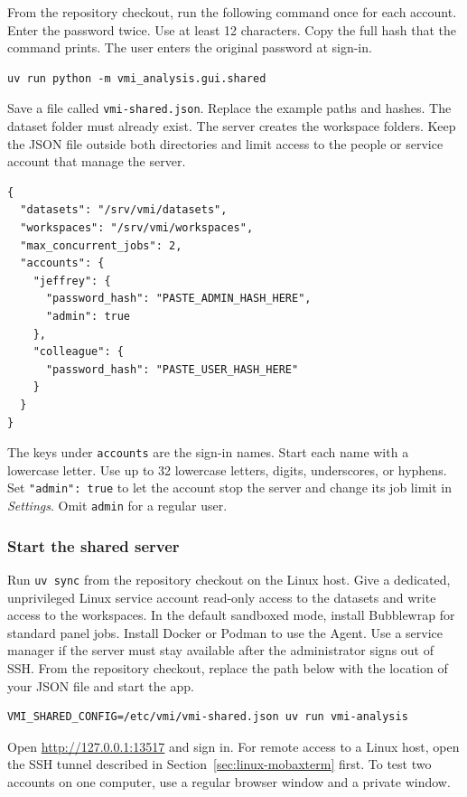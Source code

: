 \documentclass[11pt,a4paper]{article}
\newcommand{\code}[1]{\texttt{#1}}
\begin{document}
From the repository checkout, run the following command once for each
account. Enter the password twice. Use at least 12 characters. Copy the
full hash that the command prints. The user enters the original password
at sign-in.
\begin{verbatim}
uv run python -m vmi_analysis.gui.shared
\end{verbatim}

Save a file called \code{vmi-shared.json}. Replace the example paths and
hashes. The dataset folder must already exist. The server creates the
workspace folders. Keep the JSON file outside both directories and limit
access to the people or service account that manage the server.
\begin{verbatim}
{
  "datasets": "/srv/vmi/datasets",
  "workspaces": "/srv/vmi/workspaces",
  "max_concurrent_jobs": 2,
  "accounts": {
    "jeffrey": {
      "password_hash": "PASTE_ADMIN_HASH_HERE",
      "admin": true
    },
    "colleague": {
      "password_hash": "PASTE_USER_HASH_HERE"
    }
  }
}
\end{verbatim}

The keys under \code{accounts} are the sign-in names. Start each name with
a lowercase letter. Use up to 32 lowercase letters, digits, underscores,
or hyphens. Set \code{"admin": true} to let the account stop the server and
change its job limit in \emph{Settings}. Omit \code{admin} for a regular user.

\subsubsection{Start the shared server}

Run \code{uv sync} from the repository checkout on the Linux host.
Give a dedicated, unprivileged Linux service account read-only access to
the datasets and write access to the workspaces. In the default sandboxed
mode, install Bubblewrap for standard panel jobs. Install Docker or Podman
to use the Agent.
Use a service manager if the server must stay available after the administrator signs out of SSH.
From the repository checkout, replace the path below with the location of
your JSON file and start the app.
\begin{verbatim}
VMI_SHARED_CONFIG=/etc/vmi/vmi-shared.json uv run vmi-analysis
\end{verbatim}

Open \url{http://127.0.0.1:13517} and sign in. For remote access to a Linux
host, open the SSH tunnel described in Section~\ref{sec:linux-mobaxterm}
first. To test two accounts on one computer, use a regular browser window
and a private window.
\end{document}
